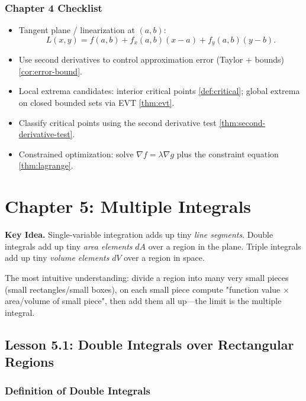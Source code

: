 \documentclass[12pt]{article}
\numberwithin{equation}{section}
\theoremstyle{plain}
\theoremstyle{definition}
\theoremstyle{remark}
\newenvironment{keyidea}{\begin{tcolorbox}\textbf{Key Idea.}}{\end{tcolorbox}}
\begin{document}
\subsubsection*{Chapter 4 Checklist}
\begin{itemize}
\item Tangent plane / linearization at $(a,b)$:
\[
L(x,y)=f(a,b)+f_x(a,b)(x-a)+f_y(a,b)(y-b).
\]
\item Use second derivatives to control approximation error (Taylor + bounds) \cref{cor:error-bound}.
\item Local extrema candidates: interior critical points \cref{def:critical}; global extrema on closed bounded sets via EVT \cref{thm:evt}.
\item Classify critical points using the second derivative test \cref{thm:second-derivative-test}.
\item Constrained optimization: solve $\nabla f=\lambda \nabla g$ plus the constraint equation \cref{thm:lagrange}.
\end{itemize}



\section{Chapter 5: Multiple Integrals}

\begin{keyidea}
Single-variable integration adds up tiny \emph{line segments}.  
Double integrals add up tiny \emph{area elements} $dA$ over a region in the plane.  
Triple integrals add up tiny \emph{volume elements} $dV$ over a region in space.  

The most intuitive understanding: divide a region into many very small pieces (small rectangles/small boxes), on each small piece compute "function value $\times$ area/volume of small piece", then add them all up—the limit is the multiple integral.
\end{keyidea}

\subsection{Lesson 5.1: Double Integrals over Rectangular Regions}

\subsubsection{Definition of Double Integrals}
\end{document}
